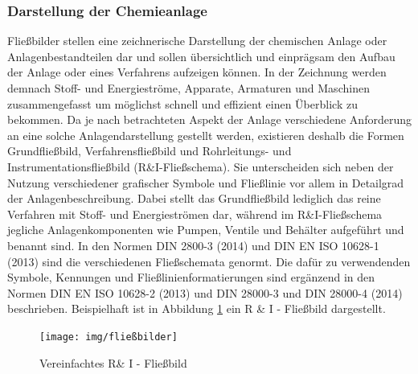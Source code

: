\subsubsection{Darstellung der Chemieanlage}
Fließbilder stellen  eine zeichnerische Darstellung der chemischen Anlage oder Anlagenbestandteilen dar und sollen übersichtlich und einprägsam den Aufbau der Anlage oder eines Verfahrens aufzeigen können. In der Zeichnung werden demnach Stoff- und Energieströme, Apparate, Armaturen und Maschinen zusammengefasst um möglichst schnell und effizient einen Überblick zu bekommen. Da je nach betrachteten Aspekt der Anlage verschiedene Anforderung an eine solche Anlagendarstellung gestellt werden, existieren deshalb die Formen Grundfließbild, Verfahrensfließbild und Rohrleitungs- und Instrumentationsfließbild (R\&I-Fließschema). Sie unterscheiden sich neben der Nutzung verschiedener grafischer Symbole und Fließlinie vor allem in Detailgrad der Anlagenbeschreibung. Dabei stellt das Grundfließbild lediglich das reine Verfahren mit Stoff- und Energieströmen dar, während im R\&I-Fließschema jegliche Anlagenkomponenten wie Pumpen, Ventile und Behälter aufgeführt und benannt sind. In den Normen DIN 2800-3 (2014) und DIN EN ISO 10628-1 (2013) sind die verschiedenen Fließschemata genormt. Die dafür zu verwendenden Symbole, Kennungen und Fließlinienformatierungen sind ergänzend in den Normen DIN EN ISO 10628-2 (2013) und DIN 28000-3 und DIN 28000-4 (2014) beschrieben. Beispielhaft ist in Abbildung \ref{fig:fließbilder} ein R \& I - Fließbild dargestellt. \cite{Ignatowitz.2015}

\begin{figure}[h!]
	\centering
	\texttt{[image: img/fließbilder]}
	\caption{Vereinfachtes R\& I - Fließbild}
	\label{fig:fließbilder}
\end{figure}
\FloatBarrier

